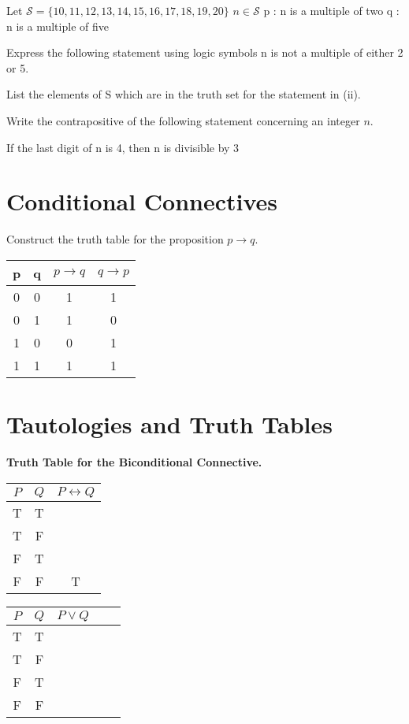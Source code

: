 \documentclass[]{report}
\begin{document}
Let $\mathcal{S} = \{10,11,12,13,14,15,16,17,18,19,20\}$
$n  \in \mathcal{S}$
p : n is a multiple of two
q : n is a multiple of five

Express the following statement using logic symbols
n is not a multiple of either 2 or 5.

List the elements of S which are in the truth set for the statement in (ii).

Write the contrapositive of the following statement concerning an integer $n$.

If the last digit of n is 4, then n is divisible by 3

\section{Conditional Connectives}
Construct the truth table for the proposition $p \rightarrow q$.

\begin{center}
	\begin{tabular}{|c|c|c|c|}
		\hline
		p & q & $p \rightarrow q$ & $q \rightarrow p$ \\
		\hline
		0 & 0 & 1& 1 \\
		0 & 1 & 1 & 0 \\
		1 & 0 & 0 & 1 \\
		1 & 1 & 1 & 1 \\
		\hline
	\end{tabular}
\end{center}

\section{Tautologies and Truth Tables}	
\textbf{Truth Table for the Biconditional Connective.} \bigskip
\begin{center}
	\begin{tabular}{|c|c|c|}
		\hline $P$  & $Q$ & $P \leftrightarrow Q$ \\ \hline
		\hline T & T &   \\ 
		\hline T & F &    \\ 
		\hline F & T &    \\ 
		\hline \phantom{sp}F \phantom{sp} & \phantom{sp}F \phantom{sp} & \phantom{sp}T \phantom{sp} \\
		\hline 
	\end{tabular} 
\end{center}

\begin{tabular}{|c|c|c|c|c|}
	\hline $P$ & $Q$ & $P \vee Q$ &  &  \\ \hline
	\hline T & T &  &  &  \\ 
	\hline T & F &  &  &  \\ 
	\hline F & T &  &  &  \\ 
	\hline \phantom{sp}F \phantom{sp} & \phantom{sp}F \phantom{sp} & \phantom{spacespa} & \phantom{spacespa}  & \phantom{spacespa} \\ 
	
	\hline 
\end{tabular} 
\end{document}
